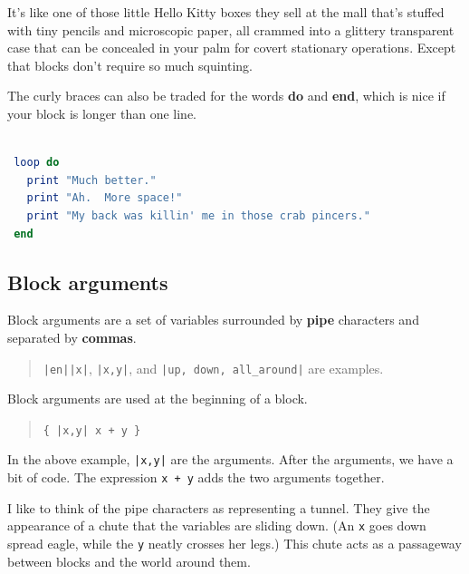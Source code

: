 \documentclass[10pt,twoside]{report}
\begin{document}
It's like one of those little Hello Kitty boxes they sell at the mall
that's stuffed with tiny pencils and microscopic paper, all crammed
into a glittery transparent case that can be concealed in your palm
for covert stationary operations.  Except that blocks don't require so
much squinting.

The curly braces can also be traded for the words {\bf do} and {\bf
  end}, which is nice if your block is longer than one line.


\begin{lstlisting}[basicstyle=\ttfamily\color{basiccolor},
    commentstyle = \ttfamily\color{commentcolor},
    keywordstyle=\ttfamily\color{keywordscolor},
    stringstyle=\color{stringcolor},
    language=Ruby,
    basicstyle=\small\ttfamily,
    showstringspaces=false,
  ]

 loop do
   print "Much better."
   print "Ah.  More space!"
   print "My back was killin' me in those crab pincers."
 end

\end{lstlisting}





\subsection{Block arguments}



Block arguments are a set of variables surrounded by {\bf pipe}
characters and separated by {\bf commas}.

\begin{quote}
\lstinline[breaklines=true]$|en||x|$,
\lstinline[breaklines=true]$|x,y|$, and
\lstinline[breaklines=true]$|up, down, all_around|$ are
examples.\end{quote}


Block arguments are used at the beginning of a block.

\begin{quote}
\lstinline[breaklines=true]${ |x,y| x + y }$\end{quote}


In the above example, \lstinline[breaklines=true]$|x,y|$ are the
arguments.  After the arguments, we have a bit of code.  The
expression \lstinline[breaklines=true]|x + y| adds the two arguments
together.

I like to think of the pipe characters as representing a tunnel.  They
give the appearance of a chute that the variables are sliding down.
(An \lstinline[breaklines=true]|x| goes down spread eagle, while the
\lstinline[breaklines=true]|y| neatly crosses her legs.)  This chute
acts as a passageway between blocks and the world around them.
\end{document}

